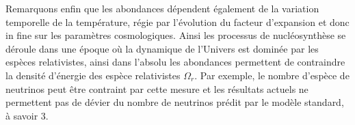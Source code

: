 Remarquons enfin que les abondances dépendent également de la variation temporelle de la température, régie par l'évolution du facteur d'expansion et donc in fine sur les paramètres cosmologiques. Ainsi les processus de nucléosynthèse se déroule dans une époque où la dynamique de l'Univers est dominée par les espèces relativistes, ainsi dans l'absolu les abondances permettent de contraindre la densité d'énergie des espèce relativistes $\Omega_r$. Par exemple, le nombre d'espèce de neutrinos peut être contraint par cette mesure et les résultats actuels ne permettent pas de dévier du nombre de neutrinos prédit par le modèle standard, à savoir 3.

